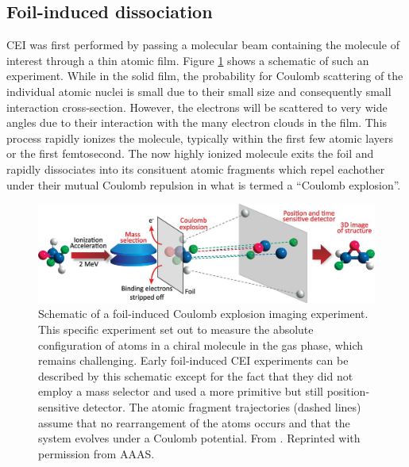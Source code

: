 \subsection{Foil-induced dissociation}
CEI was first performed by passing a molecular beam containing the molecule of interest through a thin atomic film. Figure \ref{fig:foilExperiment} shows a schematic of such an experiment. While in the solid film, the probability for Coulomb scattering of the individual atomic nuclei is small due to their small size and consequently small interaction cross-section. However, the electrons will be scattered to very wide angles due to their interaction with the many electron clouds in the film. This process rapidly ionizes the molecule, typically within the first few atomic layers or the first femtosecond. The now highly ionized molecule exits the foil and rapidly dissociates into its consituent atomic fragments which repel eachother under their mutual Coulomb repulsion in what is termed a ``Coulomb explosion''.

\begin{figure}[H]
  \centering
  \includegraphics[width=\textwidth]{gfx/FoilExperiment}
  \caption[Schematic of a foil-induced Coulomb explosion imaging experiment.]
  {Schematic of a foil-induced Coulomb explosion imaging experiment. This specific experiment set out to measure the absolute configuration of atoms in a chiral molecule in the gas phase, which remains challenging. Early foil-induced CEI experiments can be described by this schematic except for the fact that they did not employ a mass selector and used a more primitive but still position-sensitive detector. The atomic fragment trajectories (dashed lines) assume that no rearrangement of the atoms occurs and that the system evolves under a Coulomb potential. From \citet{Herwig13}. Reprinted with permission from AAAS.}
  \label{fig:foilExperiment}
\end{figure}

